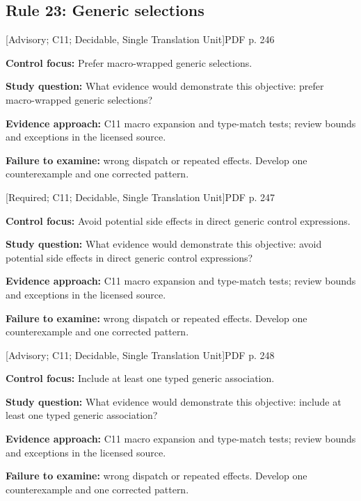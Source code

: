 \documentclass[10pt,letterpaper]{article}
\begin{document}
\subsection{Rule 23: Generic selections}
 \textsf{\footnotesize [Advisory; C11; Decidable, Single Translation Unit]}\hfill{\footnotesize PDF p. 246}\par
\textbf{Control focus:} Prefer macro-wrapped generic selections.\par
\textbf{Study question:} What evidence would demonstrate this objective: prefer macro-wrapped generic selections?\par
\textbf{Evidence approach:} C11 macro expansion and type-match tests; review bounds and exceptions in the licensed source.\par
\textbf{Failure to examine:} wrong dispatch or repeated effects. Develop one counterexample and one corrected pattern.\par
\smallskip
{}
 \textsf{\footnotesize [Required; C11; Decidable, Single Translation Unit]}\hfill{\footnotesize PDF p. 247}\par
\textbf{Control focus:} Avoid potential side effects in direct generic control expressions.\par
\textbf{Study question:} What evidence would demonstrate this objective: avoid potential side effects in direct generic control expressions?\par
\textbf{Evidence approach:} C11 macro expansion and type-match tests; review bounds and exceptions in the licensed source.\par
\textbf{Failure to examine:} wrong dispatch or repeated effects. Develop one counterexample and one corrected pattern.\par
\smallskip
{}
 \textsf{\footnotesize [Advisory; C11; Decidable, Single Translation Unit]}\hfill{\footnotesize PDF p. 248}\par
\textbf{Control focus:} Include at least one typed generic association.\par
\textbf{Study question:} What evidence would demonstrate this objective: include at least one typed generic association?\par
\textbf{Evidence approach:} C11 macro expansion and type-match tests; review bounds and exceptions in the licensed source.\par
\textbf{Failure to examine:} wrong dispatch or repeated effects. Develop one counterexample and one corrected pattern.\par
\end{document}
